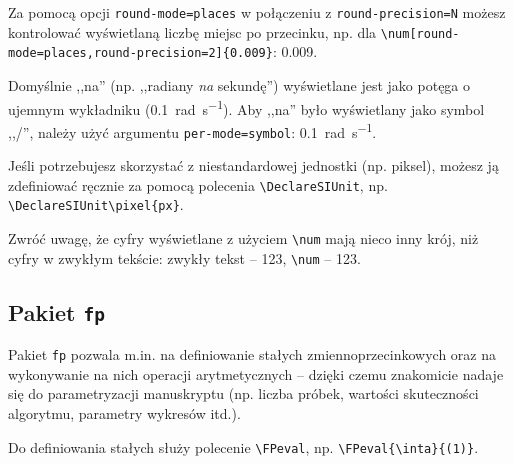\documentclass[pdftex,11pt,a4paper]{article}
\begin{document}
\par\bigskip


Za pomocą opcji \lstinline|round-mode=places| w połączeniu z \lstinline|round-precision=N| możesz kontrolować wyświetlaną liczbę miejsc po przecinku, np. dla \lstinline|\num[round-mode=places,round-precision=2]{0.009}|: \num[round-mode=places,round-precision=2]{0.009}.

\par\bigskip


Domyślnie ,,na'' (np. ,,radiany \textit{na} sekundę'') wyświetlane jest jako potęga o ujemnym wykładniku (\SI{0.1}{\radian\per\second}).
Aby ,,na'' było wyświetlany jako symbol ,,/'', należy użyć argumentu \lstinline|per-mode=symbol|: \SI[per-mode=symbol]{0.1}{\radian\per\second}.

\par\bigskip


Jeśli potrzebujesz skorzystać z niestandardowej jednostki (np. piksel), możesz ją zdefiniować ręcznie za pomocą polecenia \lstinline|\DeclareSIUnit|, np. \lstinline|\DeclareSIUnit\pixel{px}|.

\par\bigskip



Zwróć uwagę, że cyfry wyświetlane z użyciem \lstinline|\num| mają nieco inny krój, niż cyfry w zwykłym tekście: zwykły tekst -- 123, \lstinline|\num| -- \num{123}.


\cprotect\subsection{Pakiet \lstinline|fp|}

Pakiet \lstinline|fp| pozwala m.in. na definiowanie stałych zmiennoprzecinkowych oraz na wykonywanie na nich operacji arytmetycznych -- dzięki czemu znakomicie nadaje się do parametryzacji manuskryptu (np. liczba próbek, wartości skuteczności algorytmu, parametry wykresów itd.).

\par\bigskip

Do definiowania stałych służy polecenie \lstinline|\FPeval|, np. \lstinline|\FPeval{\inta}{(1)}|.

\end{document}

